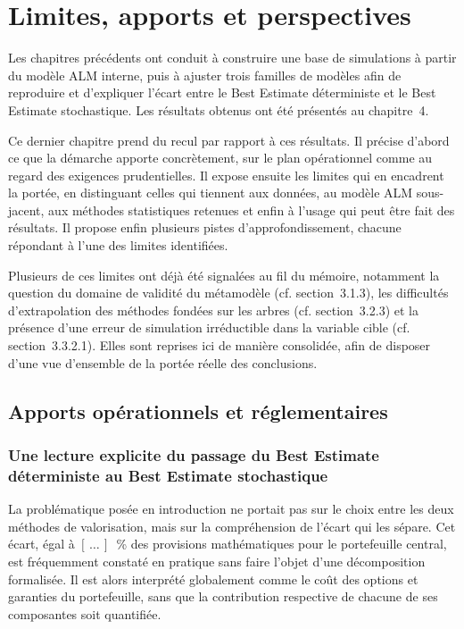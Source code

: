 \chapter{Limites, apports et perspectives}

Les chapitres précédents ont conduit à construire une base de simulations à partir du modèle ALM interne, puis à ajuster trois familles de modèles afin de reproduire et d'expliquer l'écart entre le Best Estimate déterministe et le Best Estimate stochastique. Les résultats obtenus ont été présentés au chapitre~4.

Ce dernier chapitre prend du recul par rapport à ces résultats. Il précise d'abord ce que la démarche apporte concrètement, sur le plan opérationnel comme au regard des exigences prudentielles. Il expose ensuite les limites qui en encadrent la portée, en distinguant celles qui tiennent aux données, au modèle ALM sous-jacent, aux méthodes statistiques retenues et enfin à l'usage qui peut être fait des résultats. Il propose enfin plusieurs pistes d'approfondissement, chacune répondant à l'une des limites identifiées.

Plusieurs de ces limites ont déjà été signalées au fil du mémoire, notamment la question du domaine de validité du métamodèle (cf. section~3.1.3), les difficultés d'extrapolation des méthodes fondées sur les arbres (cf. section~3.2.3) et la présence d'une erreur de simulation irréductible dans la variable cible (cf. section~3.3.2.1). Elles sont reprises ici de manière consolidée, afin de disposer d'une vue d'ensemble de la portée réelle des conclusions.

\section{Apports opérationnels et réglementaires}

\subsection{Une lecture explicite du passage du Best Estimate déterministe au Best Estimate stochastique}

La problématique posée en introduction ne portait pas sur le choix entre les deux méthodes de valorisation, mais sur la compréhension de l'écart qui les sépare. Cet écart, égal à \([\,\ldots\,]\)~\% des provisions mathématiques pour le portefeuille central, est fréquemment constaté en pratique sans faire l'objet d'une décomposition formalisée. Il est alors interprété globalement comme le coût des options et garanties du portefeuille, sans que la contribution respective de chacune de ses composantes soit quantifiée.

